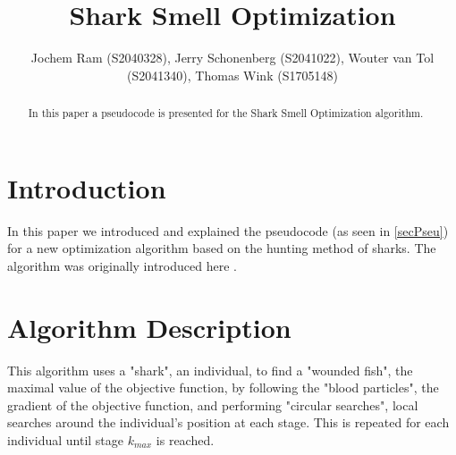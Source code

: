 \documentclass[runningheads]{llncs}
\begin{document}
%
\title{Shark Smell Optimization}
%
%
\author{Jochem Ram (S2040328), Jerry Schonenberg (S2041022), Wouter van Tol (S2041340), Thomas Wink (S1705148)}
%
%
%
\maketitle              %
%
\begin{abstract}
In this paper a pseudocode is presented for the Shark Smell Optimization algorithm.
\end{abstract}





\section{Introduction}
In this paper we introduced and explained the pseudocode (as seen in \ref{secPseu}) for a new optimization algorithm based on the hunting method of sharks. The algorithm was originally introduced here \cite{abedinia2014shark}.

\section{Algorithm Description} \label{sec:description}
This algorithm uses a "shark", an individual, to find a "wounded fish", the maximal value of the objective function, by following the "blood particles", the gradient of the objective function, and performing "circular searches", local searches around the individual's position at each stage. This is repeated for each individual until stage $k_{max}$ is reached. \\

\end{document}
